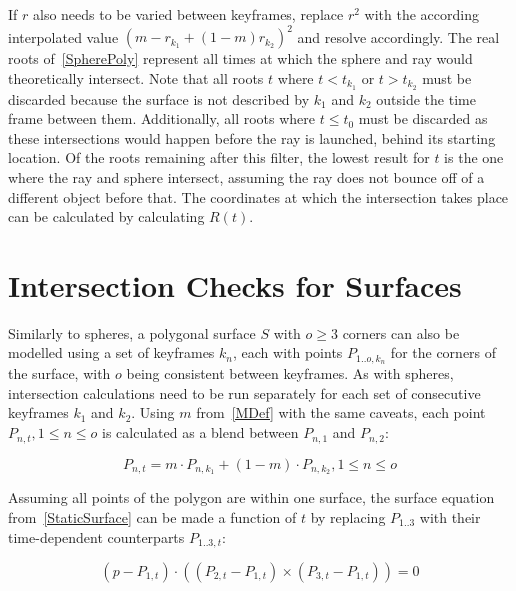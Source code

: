 If \(r\) also needs to be varied between keyframes,
replace \(r^2\) with the according interpolated value \((m - r_{k_1} + (1-m) r_{k_2})^2\) and resolve accordingly.
\newline
The real roots of~\eqref{SpherePoly} represent all times at which the sphere and ray would theoretically intersect.
Note that all roots \(t\) where \(t < t_{k_1}\) or \(t > t_{k_2}\) must be discarded
because the surface is not described by \(k_1\) and \(k_2\) outside the time frame between them.
Additionally, all roots where \(t \le t_0\) must be discarded as these intersections would happen before the ray is launched,
behind its starting location.
\newline
Of the roots remaining after this filter, the lowest result for \(t\) is the one where the ray and sphere intersect,
assuming the ray does not bounce off of a different object before that.
The coordinates at which the intersection takes place can be calculated by calculating \(R(t)\).


\section{Intersection Checks for Surfaces}

Similarly to spheres, a polygonal surface \(S\) with \(o \ge 3\) corners can also be modelled using a set of keyframes \(k_n\),
each with points \(P_{1..o, k_n}\) for the corners of the surface, with \(o\) being consistent between keyframes.
As with spheres, intersection calculations need to be run separately for each set of consecutive keyframes \(k_1\) and \(k_2\).
\newline
Using \(m\) from~\eqref{MDef} with the same caveats,
each point \(P_{n, t}, 1 \le n \le o\) is calculated as a blend between \(P_{n, 1}\) and \(P_{n, 2}\):

\begin{equation}\label{SurfacePointDef}
    P_{n, t} = m \cdot P_{n, k_1} + (1 - m) \cdot P_{n, k_2}, 1 \le n \le o
\end{equation}

Assuming all points of the polygon are within one surface,
the surface equation from~\eqref{StaticSurface} can be made a function of \(t\)
by replacing \(P_{1..3}\) with their time-dependent counterparts \(P_{1..3, t}\):

\begin{equation}\label{SurfaceDef}
    (p - P_{1, t}) \cdot ((P_{2, t} - P_{1, t}) \times (P_{3, t} - P_{1, t})) = 0
\end{equation}

